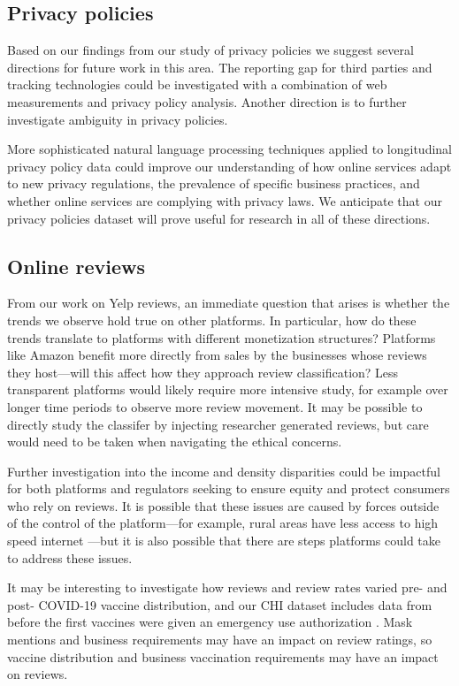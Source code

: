 \subsection{Privacy policies} \label{subsec:conclusion:privacypolicies}
Based on our findings from our study of privacy policies we suggest several directions for future work in this area. The reporting gap for third parties and tracking technologies could be investigated with a combination of web measurements and privacy policy analysis. Another direction is to further investigate ambiguity in privacy policies.

More sophisticated natural language processing techniques applied to longitudinal privacy policy data could improve our understanding of how online services adapt to new privacy regulations, the prevalence of specific business practices, and whether online services are complying with privacy laws. 
We anticipate that our privacy policies dataset will prove useful for research in all of these directions.

\subsection{Online reviews} \label{subsec:conclusion:reviews}
From our work on Yelp reviews, an immediate question that arises is whether the trends we observe hold true on other platforms. In particular, how do these trends translate to platforms with different monetization structures? Platforms like Amazon benefit more directly from sales by the businesses whose reviews they host---will this affect how they approach review classification? Less transparent platforms would likely require more intensive study, for example over longer time periods to observe more review movement. It may be possible to directly study the classifer by injecting researcher generated reviews, but care would need to be taken when navigating the ethical concerns. %

Further investigation into the income and density disparities could be impactful for both platforms and regulators seeking to ensure equity and protect consumers who rely on reviews. It is possible that these issues are caused by forces outside of the control of the platform---for example, rural areas have less access to high speed internet \cite{fcc2020broadband}---but it is also possible that there are steps platforms could take to address these issues.

It may be interesting to investigate how reviews and review rates varied pre- and post- COVID-19 vaccine distribution, and our CHI dataset includes data from before the first vaccines were given an emergency use authorization \cite{nature2020moderna}. Mask mentions and business requirements may have an impact on review ratings, so vaccine distribution and business vaccination requirements may have an impact on reviews.

